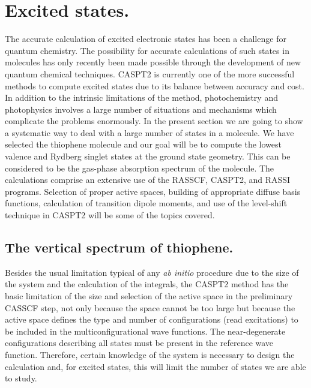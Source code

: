 \section{Excited states.}
\label{TUT:sec:excited}
The accurate calculation of excited electronic states has been
a challenge for quantum chemistry. The possibility for
accurate calculations of such states in molecules has only
recently been made possible through the development of new
quantum chemical techniques. CASPT2 is currently one of the more
successful methods to compute excited states due to its balance
between accuracy and cost. In addition to the intrinsic
limitations of the method, photochemistry and photophysics
involves a large number of situations and mechanisms which
complicate the problems enormously. In the present section we
are going to show a systematic way to deal with a large
number of states in a molecule. We have selected the thiophene
molecule and our goal will be to compute the lowest valence and
Rydberg singlet states at the ground state geometry. This can
be considered to be the gas-phase absorption spectrum of the molecule.
The calculations comprise an extensive use of the RASSCF,
CASPT2, and RASSI programs. Selection of proper active spaces,
building of appropriate diffuse basis functions, calculation
of transition dipole moments, and use of the level-shift technique
in CASPT2 will be some of the topics covered.

\subsection{The vertical spectrum of thiophene.}
\label{TUT:sec:thiophene}

Besides the usual limitation typical of any {\it ab initio} procedure
due to the size of the system and the calculation of the integrals,
the CASPT2 method has the basic limitation of the size and selection of the
active space in the preliminary CASSCF step, not only because the
space cannot be too large but because the active space defines the
type and number of configurations (read excitations) to be included
in the multiconfigurational wave functions. 
The near-degenerate configurations describing all states must
be present in the reference wave function. 
Therefore, certain knowledge of the system is necessary 
to design the calculation and, for excited states, this will
limit the number of states we are able to study.

